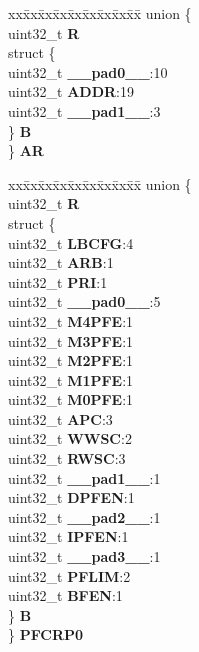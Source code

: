 \begin{DoxyCompactItemize}
\begin{tabbing}
\end{tabbing}\item 
\mbox{\label{structFLASH__tag_ab2ec143bf0e0dd31987bd15ab767530b}} 
\begin{tabbing}
xx\=xx\=xx\=xx\=xx\=xx\=xx\=xx\=xx\=\kill
union \{\\
\>uint32\_t {\bfseries R}\\
\>struct \{\\
\>\>uint32\_t {\bfseries \_\_pad0\_\_}:10\\
\>\>uint32\_t {\bfseries ADDR}:19\\
\>\>uint32\_t {\bfseries \_\_pad1\_\_}:3\\
\>\} {\bfseries B}\\
\} {\bfseries AR}\\

\end{tabbing}\item 
\mbox{\label{structFLASH__tag_aaac85988ab839193204dc225374da176}} 
\begin{tabbing}
xx\=xx\=xx\=xx\=xx\=xx\=xx\=xx\=xx\=\kill
union \{\\
\>uint32\_t {\bfseries R}\\
\>struct \{\\
\>\>uint32\_t {\bfseries LBCFG}:4\\
\>\>uint32\_t {\bfseries ARB}:1\\
\>\>uint32\_t {\bfseries PRI}:1\\
\>\>uint32\_t {\bfseries \_\_pad0\_\_}:5\\
\>\>uint32\_t {\bfseries M4PFE}:1\\
\>\>uint32\_t {\bfseries M3PFE}:1\\
\>\>uint32\_t {\bfseries M2PFE}:1\\
\>\>uint32\_t {\bfseries M1PFE}:1\\
\>\>uint32\_t {\bfseries M0PFE}:1\\
\>\>uint32\_t {\bfseries APC}:3\\
\>\>uint32\_t {\bfseries WWSC}:2\\
\>\>uint32\_t {\bfseries RWSC}:3\\
\>\>uint32\_t {\bfseries \_\_pad1\_\_}:1\\
\>\>uint32\_t {\bfseries DPFEN}:1\\
\>\>uint32\_t {\bfseries \_\_pad2\_\_}:1\\
\>\>uint32\_t {\bfseries IPFEN}:1\\
\>\>uint32\_t {\bfseries \_\_pad3\_\_}:1\\
\>\>uint32\_t {\bfseries PFLIM}:2\\
\>\>uint32\_t {\bfseries BFEN}:1\\
\>\} {\bfseries B}\\
\} {\bfseries PFCRP0}\\


\end{tabbing}
\end{DoxyCompactItemize}
